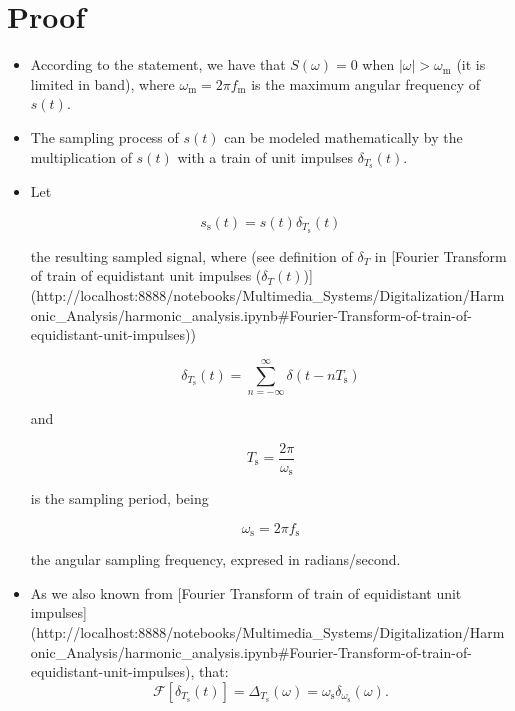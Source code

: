 \section*{Proof}
\begin{itemize}
\item According to the statement, we have that $S(\omega)=0$ when
  $|\omega|>\omega_\text{m}$ (it is limited in band), where
  $\omega_\text{m}=2\pi f_\text{m}$ is the maximum angular frequency
  of $s(t)$.

\item The sampling process of $s(t)$ can be modeled mathematically by
  the multiplication of $s(t)$ with a train of unit impulses
  $\delta_{T_\text{s}}(t)$.

\item Let

  \begin{equation}
    s_\text{s}(t)=s(t)\delta_{T_\text{s}}(t)
  \end{equation}

  the resulting sampled signal, where (see definition of $\delta_T$ in
  [Fourier Transform of train of equidistant unit impulses
    ($\delta_T(t)$)](http://localhost:8888/notebooks/Multimedia_Systems/Digitalization/Harmonic_Analysis/harmonic_analysis.ipynb#Fourier-Transform-of-train-of-equidistant-unit-impulses))

  \begin{equation}
    \delta_{T_\text{s}}(t)= \sum_{n=-\infty}^{\infty}\delta(t-nT_\text{s})
  \end{equation}

  and

  \begin{equation}
    T_\text{s}=\frac{2\pi}{\omega_\text{s}}
  \end{equation}

  is the sampling period, being

  \begin{equation}
    \omega_\text{s} = 2\pi f_\text{s}
  \end{equation}

    the angular sampling frequency, expresed in radians/second.

\item As we also known from [Fourier Transform of train of equidistant unit impulses](http://localhost:8888/notebooks/Multimedia_Systems/Digitalization/Harmonic_Analysis/harmonic_analysis.ipynb#Fourier-Transform-of-train-of-equidistant-unit-impulses), that:
  \begin{equation}
    {\mathcal F}[\delta_{T_\text{s}}(t)]=\Delta_{T_\text{s}}(\omega)=\omega_\text{s}\delta_{\omega_\text{s}}(\omega).
  \end{equation}


\end{itemize}
